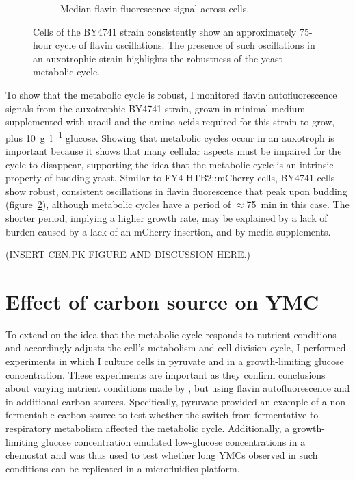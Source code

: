 \begin{figure}
\begin{subfigure}[htpb]{0.4\textwidth}
   \caption{
    Median flavin fluorescence signal across cells.
   }
   \label{fig:biology-by4741-sync-median}
  \end{subfigure}

  \caption{
    Cells of the BY4741 strain consistently show an approximately 75-hour cycle of flavin oscillations.
    The presence of such oscillations in an auxotrophic strain highlights the robustness of the yeast metabolic cycle.
  }
  \label{fig:biology-by4741-sync}
\end{figure}

To show that the metabolic cycle is robust,
I monitored flavin autofluorescence signals from the auxotrophic BY4741 strain, grown in minimal medium supplemented with uracil and the amino acids required for this strain to grow, plus \SI{10}{\gram~\litre^{-1}} glucose.
Showing that metabolic cycles occur in an auxotroph is important because it shows that many cellular aspects must be impaired for the cycle to disappear, supporting the idea that the metabolic cycle is an intrinsic property of budding yeast.
Similar to FY4 HTB2::mCherry cells, BY4741 cells show robust, consistent oscillations in flavin fluorescence that peak upon budding (figure~\ref{fig:biology-by4741-sync}), although metabolic cycles have a period of $\approx$\SI{75}{\minute} in this case.
The shorter period, implying a higher growth rate, may be explained by a lack of burden caused by a lack of an mCherry insertion, and by media supplements.

(INSERT CEN.PK FIGURE AND DISCUSSION HERE.)

\section{Effect of carbon source on YMC}
\label{sec:biology-carbon}

To extend on the idea that the metabolic cycle responds to nutrient conditions and accordingly adjusts the cell's metabolism and cell division cycle, I performed experiments in which I culture cells in pyruvate and in a growth-limiting glucose concentration.
These experiments are important as they confirm conclusions about varying nutrient conditions made by \textcite{papagiannakisAutonomousMetabolicOscillations2017},
but using flavin autofluorescence and in additional carbon sources.
Specifically, pyruvate provided an example of a non-fermentable carbon source to test whether the switch from fermentative to respiratory metabolism affected the metabolic cycle.
Additionally, a growth-limiting glucose concentration emulated low-glucose concentrations in a chemostat and was thus used to test whether long YMCs observed in such conditions can be replicated in a microfluidics platform.

